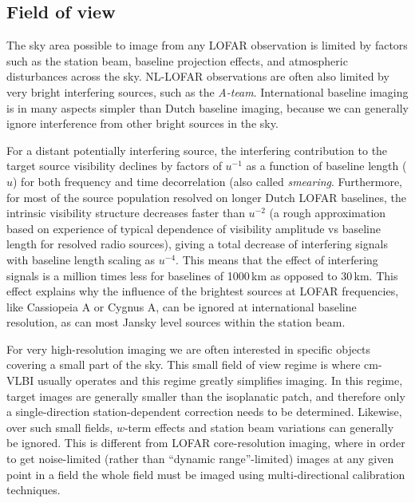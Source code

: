 \documentclass[graybox]{svmult}
\begin{document}
\subsection{Field of view}
\label{sec:fov}
The sky area possible to image from any LOFAR observation is limited by factors
such as the station beam, baseline projection effects, and atmospheric
disturbances across the sky. NL-LOFAR observations are often also limited by
very bright interfering sources, such as the \emph{A-team}.  International
baseline imaging is in many aspects simpler than Dutch baseline imaging,
because we can generally ignore interference from other bright sources in the
sky.

For a distant potentially interfering source, the interfering contribution to
the target source visibility declines by factors of $u^{-1}$ as a function of
baseline length ($u$)  for both frequency and time decorrelation (also called
\emph{smearing}.  Furthermore, for  most  of the source population resolved on
longer Dutch LOFAR baselines, the intrinsic visibility structure decreases
faster than $u^{-2}$ (a rough approximation based on experience of typical
dependence of visibility amplitude vs baseline length for resolved radio
sources), giving a total decrease of interfering signals with baseline length
scaling as $ u^{-4}$. This means  that the effect of interfering signals is a
million times less for baselines of 1000\,km as opposed to 30\,km. This effect
explains why the influence of the brightest sources at LOFAR frequencies, like
Cassiopeia A or Cygnus A, can be ignored at international baseline resolution,
as can most Jansky level sources within the station beam.

For very high-resolution imaging we are often interested in specific objects
covering a small part of the sky. This small field of view regime is where
cm-VLBI usually operates and this regime greatly simplifies imaging. In this
regime, target images are generally smaller than the isoplanatic patch, and
therefore only a single-direction station-dependent correction needs to be
determined.  Likewise, over such small fields, $w$-term effects and station
beam variations can generally be ignored.  This is different from LOFAR
core-resolution imaging, where in order to get noise-limited (rather than
``dynamic range''-limited) images at any given point in a field the whole field
must be imaged using multi-directional calibration techniques.
\end{document}

